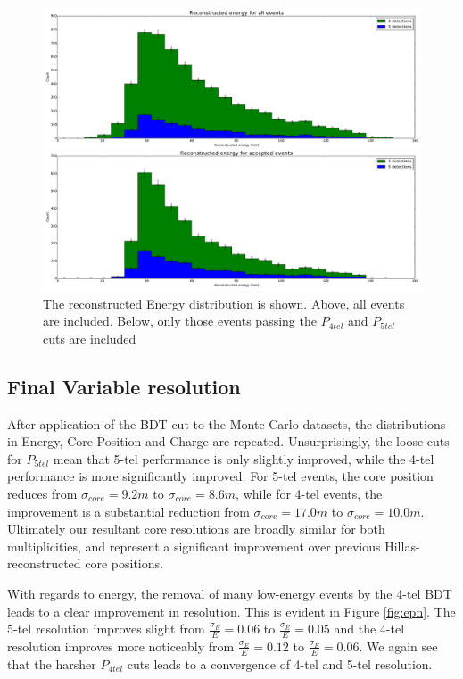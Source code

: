 \documentclass[11pt]{article}
\begin{document}
\begin{figure}
\begin{center}
\includegraphics[width=\textwidth]{energymap}
\caption{The reconstructed Energy distribution is shown. Above, all events are included. Below, only those events passing the $P_{4tel}$ and $P_{5tel}$ cuts are included}
\label{fig:energy}
\end{center}
\end{figure} 

\subsection{Final Variable resolution}
After application of the BDT cut to the Monte Carlo datasets, the distributions in Energy, Core Position and
Charge are repeated. Unsurprisingly, the loose cuts for $P_{5tel}$ mean that 5-tel performance is only slightly improved, while the 4-tel performance is more significantly improved. For 5-tel events, the core position reduces from $\sigma_{core} = 9.2m$ to $\sigma_{core} = 8.6m$, while for 4-tel events, the improvement is a substantial reduction from $\sigma_{core} = 17.0m$ to $\sigma_{core} = 10.0m$. Ultimately our resultant core resolutions are broadly similar for both multiplicities, and represent a significant improvement over previous Hillas-reconstructed core positions.

With regards to energy, the removal of many low-energy events by the 4-tel BDT leads to a clear improvement in resolution. This is evident in Figure \ref{fig:epn}. The 5-tel resolution improves slight from $\frac{\sigma_{E}}{E} = 0.06$ to $\frac{\sigma_{E}}{E} = 0.05$ and the 4-tel resolution improves more noticeably from $\frac{\sigma_{E}}{E} = 0.12$ to $\frac{\sigma_{E}}{E} = 0.06$. We again see that the harsher $P_{4tel}$ cuts leads to a convergence of 4-tel and 5-tel resolution.
\end{document}
